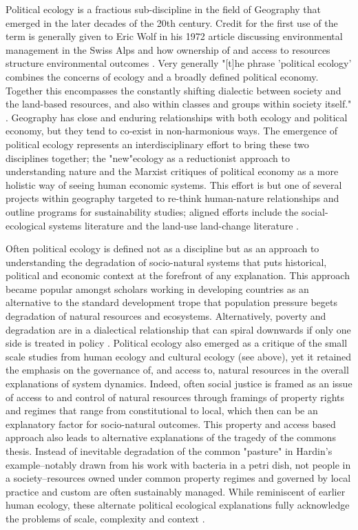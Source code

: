 Political ecology is a fractious sub-discipline in the field of Geography that emerged in the later decades of the 20th century. Credit for the first use of the term is generally given to Eric Wolf in his 1972 article discussing environmental management in the Swiss Alps and how ownership of and access to resources structure environmental outcomes \citep{wolf_1972}. Very generally "[t]he phrase 'political ecology' combines the concerns of ecology and a broadly defined political economy. Together this encompasses the constantly shifting dialectic between society and the land-based resources, and also within classes and groups within society itself." \citep[][p. 17]{blaikie_1987}. Geography has close and enduring relationships with both ecology and political economy, but they tend to co-exist in non-harmonious ways. The emergence of political ecology represents an interdisciplinary effort to bring these two disciplines together; the "new"ecology as a reductionist approach to understanding nature and the Marxist critiques of political economy as a more holistic way of seeing human economic systems. This effort is but one of several projects within geography targeted to re-think human-nature relationships and outline programs for sustainability studies; aligned efforts include the social-ecological systems literature \citep{holling_2002} and the land-use land-change literature \citep{turner_2008}.

Often political ecology is defined not as a discipline but as an approach to understanding the degradation of socio-natural systems that puts historical, political and economic context at the forefront of any explanation. This approach became popular amongst scholars working in developing countries as an alternative to the standard development trope that population pressure begets degradation of natural resources and ecosystems. Alternatively, poverty and degradation are in a dialectical relationship that can spiral downwards if only one side is treated in policy \citep{blaikie_1987, peet_1996}. Political ecology also emerged as a critique of the small scale studies from human ecology and cultural ecology (see above), yet it retained the emphasis on the governance of, and access to, natural resources in the overall explanations of system dynamics. Indeed, often social justice is framed as an issue of access to and control of natural resources  through framings of property rights and regimes that range from constitutional to local, which then can be an explanatory factor for socio-natural outcomes. This property and access based approach also leads to alternative explanations of the tragedy of the commons thesis. Instead of inevitable degradation of the common "pasture" in Hardin's example--notably drawn from his work with bacteria in a petri dish, not people in a society--resources owned under common property regimes and governed by local practice and custom are often sustainably managed. While reminiscent of earlier human ecology, these alternate political ecological explanations fully acknowledge the problems of scale, complexity and context \citep{ostrom_1999}. 

